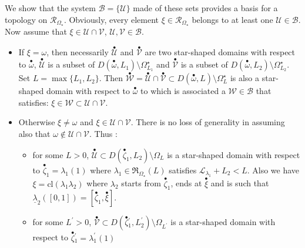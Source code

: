 \documentclass[11pt, english]{smfart}
\theoremstyle{definition}
\begin{document}
We show that the system $\mathscr{B}= \{ \mathscr{U} \}$ made of these sets
 provides a basis for a topology on
$\mathscr{R}_{\Omega_\star}$.
 Obviously, every element $\xi  \in \mathscr{R}_{\Omega_\star}$
  belongs to at least one $\mathscr{U} \in \mathscr{B}$.
Now assume that $\xi \in \mathscr{U} \cap
  \mathscr{V}$, $\mathscr{U}, \mathscr{V} \in \mathscr{B}$.
\begin{itemize}
\item If $\xi = \omega$, then necessarily
$\stackrel{\bullet}{\mathscr{U}}$ and 
$\stackrel{\bullet}{\mathscr{V}}$ are two  star-shaped domains with
  respect to ${ {\stackrel{\bullet}{\omega}} }$, $\stackrel{\bullet}{\mathscr{U}}$ is a subset
  of $ D({ {\stackrel{\bullet}{\omega}} },L_1) \setminus \Omega_{L_1}^\star$ and  
$\stackrel{\bullet}{\mathscr{V}}$ is a subset
  of ${ D({ {\stackrel{\bullet}{\omega}} },L_2) \setminus \Omega_{L_2}^\star}$. Set $L = \max
  \{L_1, L_2\}$. Then $\stackrel{\bullet}{\mathscr{W}} =
\stackrel{\bullet}{\mathscr{U}} \cap 
\stackrel{\bullet}{\mathscr{V}} \subset
  D({ {\stackrel{\bullet}{\omega}} },L) \setminus \Omega_{L}^\star$ is
  also a  star-shaped domain with
  respect to ${ {\stackrel{\bullet}{\omega}} }$ to which is associated a $\mathscr{W} \in
  \mathscr{B}$ that satisfies:
$\xi \in \mathscr{W} \subset  \mathscr{U} \cap \mathscr{V}$.
\item Otherwise  $\xi \neq \omega$ and $\xi \in 
  \mathscr{U} \cap \mathscr{V}$. There is no loss of generality in
  assuming also that $\omega \notin \mathscr{U} \cap \mathscr{V}$. Thus :
\begin{itemize}
\item for some $L>0$, $\stackrel{\bullet}{\mathscr{U}}
 \subset  D({ {\stackrel{\bullet}{\zeta}} }_1,L_2)  \setminus \Omega_{L}$  is a
  star-shaped domain with respect to ${ {\stackrel{\bullet}{\zeta}} }_1 = \lambda_1(1)$  where
  $\lambda_1 \in  \mathfrak{R}_{\Omega_\star}(L) $  satisfies $\displaystyle
  \mathcal{L}_{\lambda_1}+L_2 <L$. Also we have $\xi = \mathrm{cl}(\lambda_1
  \lambda_2)$ where
 $\lambda_2$ starts from ${ {\stackrel{\bullet}{\zeta}} }_1$, ends at ${ {\stackrel{\bullet}{\xi}} }$ and is such that
${ \underline{\lambda}_2([0,1]) = [{ {\stackrel{\bullet}{\zeta}} }_1,{ {\stackrel{\bullet}{\xi}} }] }$.
\item for some $L^\prime>0$, $\stackrel{\bullet}{\mathscr{V}}
 \subset  D({ {\stackrel{\bullet}{\zeta}} }{_1^\prime},L_2^\prime) \setminus \Omega_{L^\prime} $  is a
  star-shaped domain with   respect to ${ {\stackrel{\bullet}{\zeta}} }{_1^\prime} = \lambda_1^\prime(1)$

\end{itemize}
\end{itemize}
\end{document}
